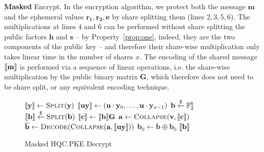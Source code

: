 \noindent\textbf{Masked} \textsf{Encrypt}. In the encryption algorithm, 
we protect both the message $\mathbf{m}$ and the ephemeral values 
$\mathbf{r_1},\mathbf{r_2},\mathbf{e}$ by share splitting them (lines $2,3,5,6$).
The multiplications at lines $4$ and $6$ can be performed without share splitting
the public factors $\mathbf{h}$ and $\mathbf{s}$ -- by Property~\ref{prop:one}, 
indeed, they are the two components of the public key -- and therefore their 
share-wise multiplication only takes linear time in the number of shares $x$.
The encoding of the shared message $ \llbracket \mathbf{m} \rrbracket $ is performed via a sequence
of linear operations, i.e. the share-wise multiplication by the public binary 
matrix $\mathbf{G}$, which therefore does not need to be share split, or any 
equivalent encoding technique.
\begin{figure}[!t]
\noindent\begin{minipage}{0.99\textwidth}
\footnotesize
\begin{algorithm}[H]
    \caption{Masked HQC.PKE \textsf{Decrypt}\label{alg:dec}}

    $ \llbracket \mathbf{y} \rrbracket  \gets \text{\sc Split}(\mathbf{y})$\;
    $ \llbracket \mathbf{uy} \rrbracket  \gets (\mathbf{u}\cdot\mathbf{y}_0,\ldots,\mathbf{u}\cdot\mathbf{y}_{x-1})$\;
    $\mathbf{b}  \stackrel{\$}{\gets}  \mathbb{F}_2^k$\;
    $ \llbracket \mathbf{b} \rrbracket   \stackrel{\$}{\gets}  \text{\sc Split}(\mathbf{b})$\;
    $ \llbracket \mathbf{c} \rrbracket  \gets  \llbracket \mathbf{b} \rrbracket \mathbf{G}$\; 
    $\mathbf{a} \gets \text{\sc Collapse}(\mathbf{v} , \llbracket \mathbf{c} \rrbracket )$\;
    $\overline{\mathbf{b}} \gets \text{\sc Decode}(\text{\sc Collapse}(\mathbf{a}, \llbracket \mathbf{uy} \rrbracket ))$
    $\mathbf{b}_0 \gets \overline{\mathbf{b}} \oplus\mathbf{b}_0$
    \KwRet $ \llbracket \mathbf{b} \rrbracket $\;
    \end{algorithm}
\end{minipage}
\vspace{-0.4cm}
\end{figure}

